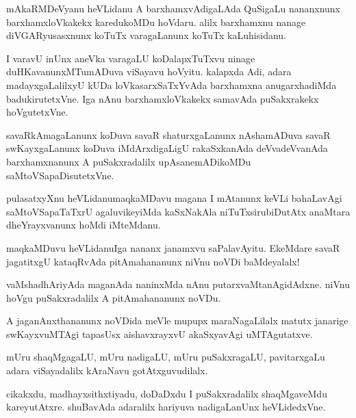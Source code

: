 \begin{mng}
mAkaRMDeVyanu heVLidanu A barxhamxvAdigaLAda QuSigaLu nananxnunx barxhamxloVkakekx karedukoMDu hoVdaru. alilx barxhamxnu nanage diVGARyusasxnunx koTuTx varagaLanunx koTuTx kaLuhisidanu.
\end{mng}

\begin{mng}
I varavU inUnx aneVka varagaLU koDalapxTuTxvu ninage duHKavanunxMTumADuva viSayavu hoVyitu. kalapxda Adi, adara madayxgaLalilxyU kUDa loVkasarxSaTxYvAda barxhamxna anugarxhadiMda badukirutetxVne. Iga nAnu barxhamxloVkakekx samavAda puSakxrakekx hoVgutetxVne.
\end{mng}

\begin{mng}
savaRkAmagaLanunx koDuva savaR shaturxgaLanunx nAshamADuva savaR swKayxgaLanunx koDuva iMdArxdigaLigU rakaSxkanAda deVvadeVvanAda barxhamxnanunx A puSakxradalilx upAsanemADikoMDu saMtoVSapaDisutetxVne.
\end{mng}

\begin{mng}
pulasatxyXnu heVLidanu\mdash maqkaMDavu magana I mAtanunx keVLi bahaLavAgi saMtoVSapaTaTxrU agaluvikeyiMda kaSxNakAla niTuTxsirubiDutAtx anaMtara dheYrayxvanunx hoMdi iMteMdanu.
\end{mng}

\begin{mng}
maqkaMDuvu heVLidanu\mdash Iga nananx janamxvu saPalavAyitu. EkeMdare savaR jagatitxgU kataqRvAda pitAmahananunx niVnu noVDi baMdeyalalx!
\end{mng}

\begin{mng}
vaMshadhAriyAda maganAda naninxMda nAnu putarxvaMtanAgidAdxne. niVnu hoVgu puSakxradalilx A pitAmahananunx noVDu.
\end{mng}

\begin{mng}
A jaganAnxthananunx noVDida meVle mupupx maraNagaLilalx matutx janarige swKayxvuMTAgi tapasUsx aishavxrayxvU akaSxyavAgi uMTAgutatxve.
\end{mng}

\begin{mng}
mUru shaqMgagaLU, mUru nadigaLU, mUru puSakxragaLU, pavitarxgaLu adara viSayadalilx kAraNavu gotAtxguvudilalx.
\end{mng}

\begin{mng}
cikakxdu, madhayxsithxtiyadu, doDaDxdu I puSakxradalilx shaqMgaveMdu kareyutAtxre. shuBavAda adaralilx hariyuva nadigaLanUnx heVLidedxVne.
\end{mng}

